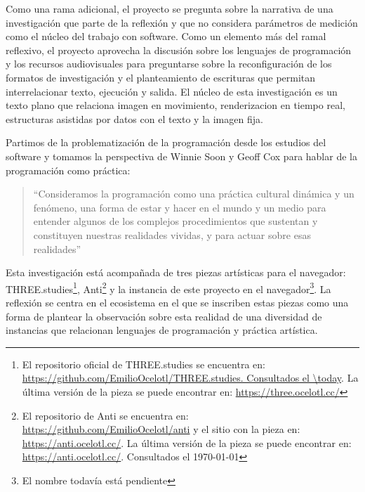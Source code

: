 Como una rama adicional, el proyecto se pregunta sobre la narrativa de una investigación que parte de la reflexión y que no considera parámetros de medición como el núcleo del trabajo con software. Como un elemento más del ramal reflexivo, el proyecto aprovecha la discusión sobre los lenguajes de programación y los recursos audiovisuales para preguntarse sobre la reconfiguración de los formatos de investigación y el planteamiento de escrituras que permitan interrelacionar texto, ejecución y salida. El núcleo de esta investigación es un texto plano que relaciona imagen en movimiento, \gls{renderizacion} en tiempo real, estructuras asistidas por datos con el texto y la imagen fija.%

Partimos de la problematización de la programación desde los estudios del software y tomamos la perspectiva de Winnie Soon y Geoff Cox para hablar de la programación como práctica:

\begin{quote}

``Consideramos la programación como una práctica cultural dinámica y un fenómeno, una forma de estar y hacer en el mundo y un medio para entender algunos de los complejos procedimientos que sustentan y constituyen nuestras realidades vividas, y para actuar sobre esas realidades'' \citep[p.~14]{aestheticProgramming}
  
\end{quote}






Esta investigación está acompañada de tres piezas artísticas para el navegador: THREE.studies\footnote{El repositorio oficial de THREE.studies se encuentra en: \url{https://github.com/EmilioOcelotl/THREE.studies. Consultados el \today}. La última versión de la pieza se puede encontrar en: \url{https://three.ocelotl.cc/}}, Anti\footnote{El repositorio de Anti se encuentra en: \url{https://github.com/EmilioOcelotl/anti} y el sitio con la pieza en: \url{https://anti.ocelotl.cc/}. La última versión de la pieza se puede encontrar en: \url{https://anti.ocelotl.cc/}. Consultados el \today} y la instancia de este proyecto en el navegador\footnote{El nombre todavía está pendiente}. La reflexión se centra en el ecosistema en el que se inscriben estas piezas como una forma de plantear la observación sobre esta realidad de una diversidad de instancias que relacionan lenguajes de programación y práctica artística.

